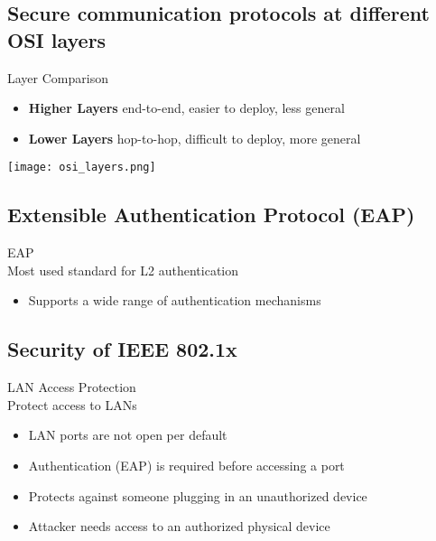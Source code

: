 \subsection{Secure communication protocols at different OSI layers}

\begin{concept}{Layer Comparison}\\
    \begin{itemize}
        \item \textbf{Higher Layers} end-to-end, easier to deploy, less general
        \item \textbf{Lower Layers} hop-to-hop, difficult to deploy, more general
    \end{itemize}
\end{concept}

\texttt{[image: osi\_layers.png]}

\subsection{Extensible Authentication Protocol (EAP)}

\begin{definition}{EAP}\\
    Most used standard for L2 authentication
    \begin{itemize}
        \item Supports a wide range of authentication mechanisms
    \end{itemize}
\end{definition}

\subsection{Security of IEEE 802.1x}

\begin{concept}{LAN Access Protection}\\
    Protect access to LANs
    \begin{itemize}
        \item LAN ports are not open per default
        \item Authentication (EAP) is required before accessing a port
        \item Protects against someone plugging in an unauthorized device
        \item Attacker needs access to an authorized physical device
    \end{itemize}
\end{concept}

